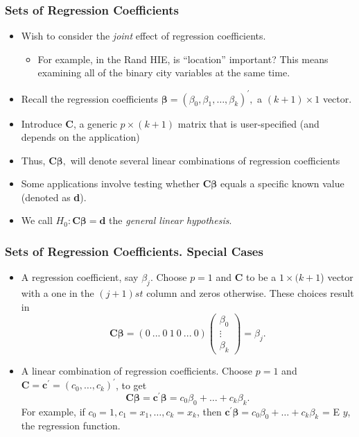 \begin{frame}%
 \frametitle{Sets of Regression Coefficients}
\begin{itemize}
\item Wish to consider the \emph{joint} effect of regression coefficients.
\begin{itemize}
\item For example, in the Rand HIE, is ``location'' important? This
means examining all of the binary city variables at the same time.
  \end{itemize}
\item Recall the regression coefficients
$\boldsymbol \beta =\left( \beta _{0}, \beta _{1}, \dots,\beta
_{k}\right) ^{\prime },$ a $(k+1)\times 1$ vector.
\item Introduce \textbf{C}, a generic  $p\times (k+1)$ matrix that is
user-specified (and depends on the application)
\item Thus, $\mathbf{C} \boldsymbol
\beta,$ will denote several linear combinations of regression
coefficients
\item Some applications  involve testing whether $\mathbf{C} \boldsymbol \beta$ equals
a specific known value (denoted as \textbf{d}).
\item We call
$H_{0}:\mathbf{C \boldsymbol \beta =d}$ the \emph{general linear
hypothesis}.

  \end{itemize}
\end{frame}

\begin{frame}%
 \frametitle{Sets of Regression Coefficients. Special Cases}
\begin{itemize}
\item A regression coefficient, say
$\beta_j.$ Choose $p=1$ and \textbf{C} to be a $1\times (k+1$)
vector with a one in the $(j+1)st$ column and zeros otherwise. These
choices result in
\begin{equation*}
\mathbf{C \boldsymbol \beta =}\left( 0~...~0~1~0~...~0\right) \left(
\begin{array}{c}
\beta _{0} \\
\vdots  \\
\beta _{k}%
\end{array}
\right) =\beta_j.
\end{equation*}
\item A linear combination of regression
coefficients. Choose $p=1$ and $\mathbf{C = c^{\prime}}= \left(c_0,
\ldots, c_k \right)^{\prime}$, to get
\begin{equation*}
\mathbf{C} \boldsymbol \beta =\mathbf{c}^{\prime} \boldsymbol \beta
= c_0 \beta_0 + \ldots + c_k \beta_k.
\end{equation*}
For example, if $c_0 = 1, c_1=x_1, \ldots, c_k=x_k$, then
$\mathbf{c}^{\prime} \boldsymbol \beta = c_0 \beta_0 + \ldots + c_k
\beta_k$ = E $y$, the regression function.
  \end{itemize}
\end{frame}

